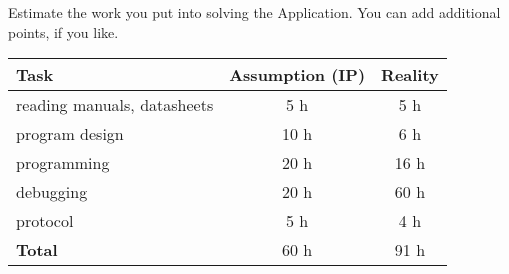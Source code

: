 \documentclass[12pt,a4paper,titlepage,oneside]{article}
\begin{document}
Estimate the work you put into solving the Application.
You can add additional points, if you like.

\begin{tabular}{|l|c|c|}\hline
	Task & Assumption (IP) & Reality \\ \hline

	reading manuals, datasheets &  5 h &  5 h\\
	program design              & 10 h &  6 h\\
	programming                 & 20 h & 16 h\\
	debugging                   & 20 h & 60 h\\
	protocol                    & 5  h &  4 h\\ \hline

	\textbf{Total}              & 60 h & 91 h\\ \hline
\end{tabular}


\newpage
\end{document}

